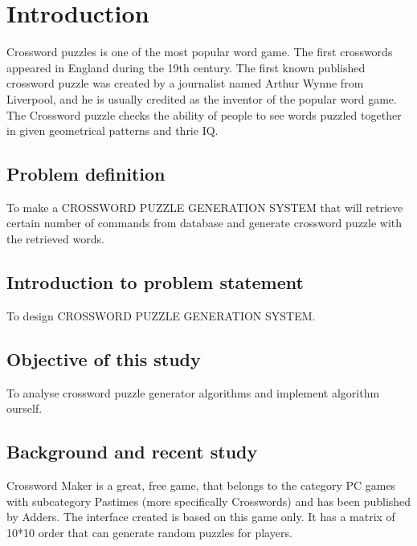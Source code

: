 \chapter{Introduction}
Crossword puzzles is one of the most popular word game. The first crosswords appeared in England during the 19th century. The first known published crossword puzzle was created by a journalist named Arthur Wynne from Liverpool, and he is usually credited as the inventor of the popular word game. The Crossword puzzle checks the ability of people to see words puzzled together in given geometrical patterns and thrie IQ.


\section{Problem definition}
To make a CROSSWORD PUZZLE GENERATION SYSTEM that will retrieve certain number of commands from database and generate crossword puzzle with the retrieved words.

\section{Introduction to problem statement}
To design CROSSWORD PUZZLE GENERATION SYSTEM.

\section{Objective of this study}
To analyse crossword puzzle generator algorithms and implement algorithm ourself.


\section{Background and recent study}
Crossword Maker is a great, free game, that belongs to the category PC games with subcategory Pastimes (more specifically Crosswords) and has been published by Adders.
The interface created is based on this game only. It has a matrix of 10*10 order that can generate random puzzles for players.



